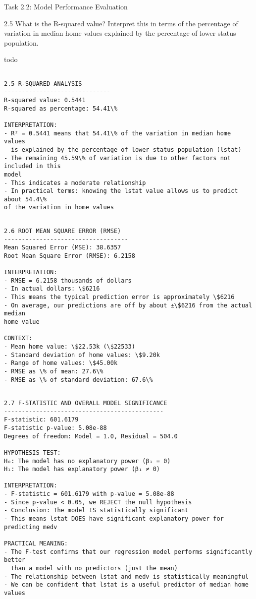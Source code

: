 \documentclass[11pt, twocolumn]{article}
\begin{document}
    Task 2.2: Model Performance Evaluation

    2.5 What is the R-squared value? Interpret this in terms of the
percentage of variation in median home values explained by the
percentage of lower status population.

todo

    \begin{Verbatim}[commandchars=\\\{\}]

2.5 R-SQUARED ANALYSIS
------------------------------
R-squared value: 0.5441
R-squared as percentage: 54.41\%

INTERPRETATION:
- R² = 0.5441 means that 54.41\% of the variation in median home values
  is explained by the percentage of lower status population (lstat)
- The remaining 45.59\% of variation is due to other factors not included in this
model
- This indicates a moderate relationship
- In practical terms: knowing the lstat value allows us to predict about 54.4\%
of the variation in home values
    \end{Verbatim}

    \begin{Verbatim}[commandchars=\\\{\}]

2.6 ROOT MEAN SQUARE ERROR (RMSE)
-----------------------------------
Mean Squared Error (MSE): 38.6357
Root Mean Square Error (RMSE): 6.2158

INTERPRETATION:
- RMSE = 6.2158 thousands of dollars
- In actual dollars: \$6216
- This means the typical prediction error is approximately \$6216
- On average, our predictions are off by about ±\$6216 from the actual median
home value

CONTEXT:
- Mean home value: \$22.53k (\$22533)
- Standard deviation of home values: \$9.20k
- Range of home values: \$45.00k
- RMSE as \% of mean: 27.6\%
- RMSE as \% of standard deviation: 67.6\%
    \end{Verbatim}

    \begin{Verbatim}[commandchars=\\\{\}]

2.7 F-STATISTIC AND OVERALL MODEL SIGNIFICANCE
---------------------------------------------
F-statistic: 601.6179
F-statistic p-value: 5.08e-88
Degrees of freedom: Model = 1.0, Residual = 504.0

HYPOTHESIS TEST:
H₀: The model has no explanatory power (β₁ = 0)
H₁: The model has explanatory power (β₁ ≠ 0)

INTERPRETATION:
- F-statistic = 601.6179 with p-value = 5.08e-88
- Since p-value < 0.05, we REJECT the null hypothesis
- Conclusion: The model IS statistically significant
- This means lstat DOES have significant explanatory power for predicting medv

PRACTICAL MEANING:
- The F-test confirms that our regression model performs significantly better
  than a model with no predictors (just the mean)
- The relationship between lstat and medv is statistically meaningful
- We can be confident that lstat is a useful predictor of median home values
    \end{Verbatim}
\end{document}
